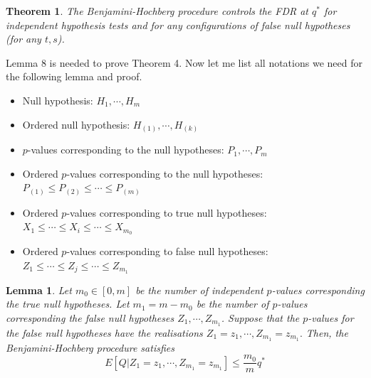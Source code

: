 \documentclass[12pt]{article}
\theoremstyle{plain}
\newtheorem{theorem}{Theorem}
\newtheorem{lemma}{Lemma}
\theoremstyle{definition}
\theoremstyle{remark}
\begin{document}
\begin{theorem}
The Benjamini-Hochberg procedure controls the FDR at $q^*$
for independent hypothesis tests and for any configurations of false null hypotheses (for any $t,s$). \cite{5.7}
\end{theorem}

Lemma 8 is needed to prove Theorem 4. Now let me list all notations \cite{5.3} we need for the following lemma and proof.
\begin{itemize}
    \item Null hypothesis: $H_1,\cdots,H_m$
    \item Ordered null hypothesis: $H_{(1)},\cdots,H_{(k)}$
    \item $p$-values corresponding to the null hypotheses: $P_1,\cdots,P_m$
    \item Ordered $p$-values corresponding to the null hypotheses: $P_{(1)}\leq P_{(2)}\leq\cdots\leq P_{(m)}$
    \item Ordered $p$-values corresponding to true null hypotheses: $X_1\leq \cdots\leq X_i\leq \cdots\leq X_{m_0}$
    \item Ordered $p$-values corresponding to false null hypotheses: $Z_1\leq \cdots\leq Z_j\leq \cdots\leq Z_{m_1}$
\end{itemize}


\begin{lemma}\cite{5.3}\cite{5.7}
Let $m_0\in[0,m]$ be the number of independent $p$-values corresponding the true null hypotheses. Let $m_1=m-m_0$ be the number of $p$-values corresponding the false null hypotheses $Z_1,\cdots,Z_{m_1}$. Suppose that the $p$-values for the false null hypotheses have the realisations $Z_1=z_1,\cdots,Z_{m_1}=z_{m_1}.$
Then, the Benjamini-Hochberg procedure satisfies\[
E[Q|Z_1=z_1,\cdots,Z_{m_1}=z_{m_1}]\leq \frac{m_0}{m}q^*
\]
\end{lemma}
\end{document}
